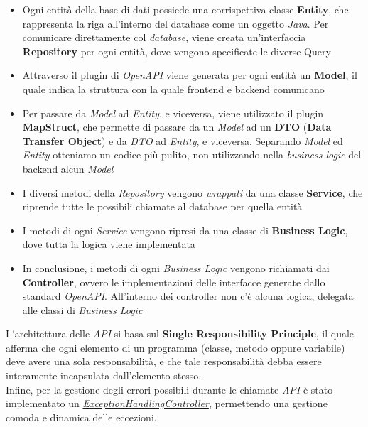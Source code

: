 \documentclass{article}
\begin{document}
\begin{itemize}[label = {-}]
    \itemsep0em
    \item Ogni entità della base di dati possiede una corrispettiva classe \textbf{Entity}, che rappresenta la riga all'interno del database come un oggetto \textit{Java}. Per comunicare direttamente col \textit{database}, viene creata un'interfaccia \textbf{Repository} per ogni entità, dove vengono specificate le diverse Query
    \item Attraverso il plugin di \textit{OpenAPI} viene generata per ogni entità un \textbf{Model}, il quale indica la struttura con la quale frontend e backend comunicano
    \item Per passare da \textit{Model} ad \textit{Entity}, e viceversa, viene utilizzato il plugin \textbf{MapStruct}, che permette di passare da un \textit{Model} ad un \textbf{DTO} (\textbf{Data Transfer Object}) e da \textit{DTO} ad \textit{Entity}, e viceversa. Separando \textit{Model} ed \textit{Entity} otteniamo un codice più pulito, non utilizzando nella \textit{business logic} del backend alcun \textit{Model}
    \item I diversi metodi della \textit{Repository} vengono \textit{wrappati} da una classe \textbf{Service}, che riprende tutte le possibili chiamate al database per quella entità
    \item I metodi di ogni \textit{Service} vengono ripresi da una classe di \textbf{Business Logic}, dove tutta la logica viene implementata
    \item In conclusione, i metodi di ogni \textit{Business Logic} vengono richiamati dai \textbf{Controller}, ovvero le implementazioni delle interfacce generate dallo standard \textit{OpenAPI}. All'interno dei controller non c'è alcuna logica, delegata alle classi di \textit{Business Logic}
\end{itemize}
L'architettura delle \textit{API} si basa sul \textbf{Single Responsibility Principle}, il quale afferma che ogni elemento di un programma (classe, metodo oppure variabile) deve avere una sola responsabilità, e che tale responsabilità debba essere interamente incapsulata dall'elemento stesso.\vspace*{7pt}\\
Infine, per la gestione degli errori possibili durante le chiamate \textit{API} è stato implementato un \href{https://github.com/DavideDeRosa/storJ_SWE/blob/develop/backend/src/main/java/com/grandel/storj/error/ExceptionHandlingController.java}{\textit{ExceptionHandlingController}}, permettendo una gestione comoda e dinamica delle eccezioni.\vspace*{7pt}\\
\end{document}
